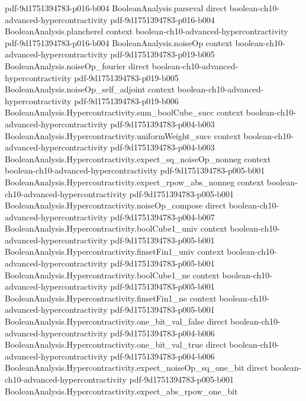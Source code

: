 \begin{theorem}
  {pdf-9d1751394783-p016-b004}
\proofstep
  {BooleanAnalysis.parseval}
  {direct}
  {boolean-ch10-advanced-hypercontractivity}
  {pdf-9d1751394783-p016-b004}
\proofstep
  {BooleanAnalysis.plancherel}
  {context}
  {boolean-ch10-advanced-hypercontractivity}
  {pdf-9d1751394783-p016-b004}
\proofstep
  {BooleanAnalysis.noiseOp}
  {context}
  {boolean-ch10-advanced-hypercontractivity}
  {pdf-9d1751394783-p019-b005}
\proofstep
  {BooleanAnalysis.noiseOp_fourier}
  {direct}
  {boolean-ch10-advanced-hypercontractivity}
  {pdf-9d1751394783-p019-b005}
\proofstep
  {BooleanAnalysis.noiseOp_self_adjoint}
  {context}
  {boolean-ch10-advanced-hypercontractivity}
  {pdf-9d1751394783-p019-b006}
\proofstep
  {BooleanAnalysis.Hypercontractivity.sum_boolCube_succ}
  {context}
  {boolean-ch10-advanced-hypercontractivity}
  {pdf-9d1751394783-p004-b003}
\proofstep
  {BooleanAnalysis.Hypercontractivity.uniformWeight_succ}
  {context}
  {boolean-ch10-advanced-hypercontractivity}
  {pdf-9d1751394783-p004-b003}
\proofstep
  {BooleanAnalysis.Hypercontractivity.expect_sq_noiseOp_nonneg}
  {context}
  {boolean-ch10-advanced-hypercontractivity}
  {pdf-9d1751394783-p005-b001}
\proofstep
  {BooleanAnalysis.Hypercontractivity.expect_rpow_abs_nonneg}
  {context}
  {boolean-ch10-advanced-hypercontractivity}
  {pdf-9d1751394783-p005-b001}
\proofstep
  {BooleanAnalysis.Hypercontractivity.noiseOp_compose}
  {direct}
  {boolean-ch10-advanced-hypercontractivity}
  {pdf-9d1751394783-p004-b007}
\proofstep
  {BooleanAnalysis.Hypercontractivity.boolCube1_univ}
  {context}
  {boolean-ch10-advanced-hypercontractivity}
  {pdf-9d1751394783-p005-b001}
\proofstep
  {BooleanAnalysis.Hypercontractivity.finsetFin1_univ}
  {context}
  {boolean-ch10-advanced-hypercontractivity}
  {pdf-9d1751394783-p005-b001}
\proofstep
  {BooleanAnalysis.Hypercontractivity.boolCube1_ne}
  {context}
  {boolean-ch10-advanced-hypercontractivity}
  {pdf-9d1751394783-p005-b001}
\proofstep
  {BooleanAnalysis.Hypercontractivity.finsetFin1_ne}
  {context}
  {boolean-ch10-advanced-hypercontractivity}
  {pdf-9d1751394783-p005-b001}
\proofstep
  {BooleanAnalysis.Hypercontractivity.one_bit_val_false}
  {direct}
  {boolean-ch10-advanced-hypercontractivity}
  {pdf-9d1751394783-p004-b006}
\proofstep
  {BooleanAnalysis.Hypercontractivity.one_bit_val_true}
  {direct}
  {boolean-ch10-advanced-hypercontractivity}
  {pdf-9d1751394783-p004-b006}
\proofstep
  {BooleanAnalysis.Hypercontractivity.expect_noiseOp_sq_one_bit}
  {direct}
  {boolean-ch10-advanced-hypercontractivity}
  {pdf-9d1751394783-p005-b001}
\proofstep
  {BooleanAnalysis.Hypercontractivity.expect_abs_rpow_one_bit}

\end{theorem}
